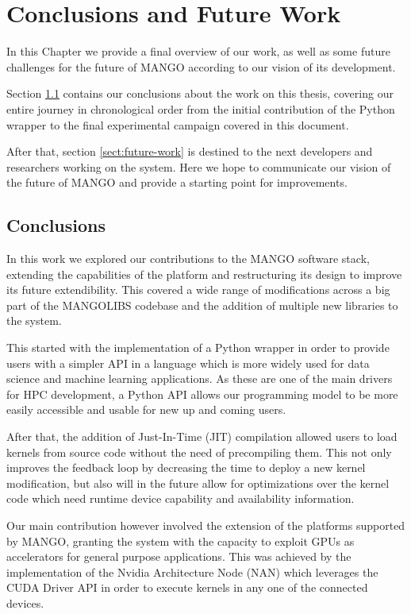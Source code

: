 \chapter{Conclusions and Future Work} \label{ch:Conclusions}

In this Chapter we provide a final overview of our work, as well as some future challenges for the future of MANGO according to our vision of its development.

Section \ref{sect:conclusions} contains our conclusions about the work on this thesis, covering our entire journey in chronological order from the initial contribution of the Python wrapper to the final experimental campaign covered in this document.

After that, section \ref{sect:future-work} is destined to the next developers and researchers working on the system. Here we hope to communicate our vision of the future of MANGO and provide a starting point for improvements. 

\section{Conclusions} \label{sect:conclusions}

In this work we explored our contributions to the MANGO software stack, extending the capabilities of the platform and restructuring its design to improve its future extendibility. This covered a wide range of modifications across a big part of the MANGOLIBS codebase and the addition of multiple new libraries to the system.

This started with the implementation of a Python wrapper in order to provide users with a simpler API in a language which is more widely used for data science and machine learning applications. As these are one of the main drivers for HPC development, a Python API allows our programming model to be more easily accessible and usable for new up and coming users.

After that, the addition of Just-In-Time (JIT) compilation allowed users to load kernels from source code without the need of precompiling them. This not only improves the feedback loop by decreasing the time to deploy a new kernel modification, but also will in the future allow for optimizations over the kernel code which need runtime device capability and availability information.

Our main contribution however involved the extension of the platforms supported by MANGO, granting the system with the capacity to exploit GPUs as accelerators for general purpose applications. This was achieved by the implementation of the Nvidia Architecture Node (NAN) which leverages the CUDA Driver API in order to execute kernels in any one of the connected devices. 

